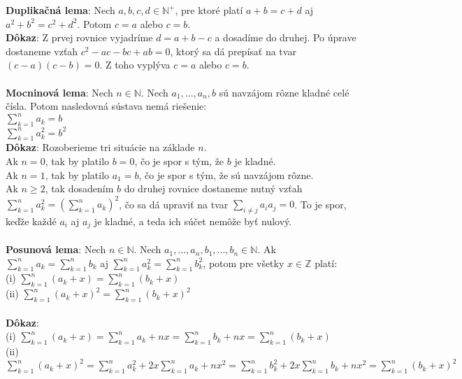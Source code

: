 \documentclass[12pt]{article}
\begin{document}
\textbf{Duplikačná lema}: Nech $a,b,c,d \in \mathbb{N^+}$, pre ktoré platí $a + b = c + d$ aj $a^2 + b^2 = c^2 + d^2$. Potom $c = a$ alebo $c = b$. \\
 
\textbf{Dôkaz}: Z prvej rovnice vyjadríme $d = a + b - c$ a dosadíme do druhej. Po úprave dostaneme vzťah $c^2 - ac - bc + ab = 0$, ktorý sa dá prepísať na tvar $(c - a)(c - b) = 0$. Z toho vyplýva $c = a$ alebo $c = b$. \\\\

\textbf{Mocninová lema}: Nech $n \in \mathbb{N}$. Nech $a_1, ... , a_n , b$ sú navzájom rôzne kladné celé čísla. Potom nasledovná sústava nemá riešenie: \\
$\sum_{k=1}^{n} a_k = b$ \\
$\sum_{k=1}^{n} a^2_k = b^2$ \\

\textbf{Dôkaz}: Rozoberieme tri situácie na základe $n$. \\

Ak $n = 0$, tak by platilo $b = 0$, čo je spor s tým, že $b$ je kladné. \\

Ak $n = 1$, tak by platilo $a_1 = b$, čo je spor s tým, že sú navzájom rôzne. \\

Ak $n \geq 2$, tak dosadením $b$ do druhej rovnice dostaneme nutný vzťah $\sum_{k=1}^{n} a^2_k = (\sum_{k=1}^{n} a_k)^2$, čo sa dá upraviť na tvar $\sum_{i \neq j} a_i a_j = 0$. To je spor, keďže každé $a_i$ aj $a_j$ je kladné, a teda ich súčet nemôže byť nulový. \\\\

\textbf{Posunová lema}: Nech $n \in \mathbb{N}$. Nech $a_1, ... , a_n, b_1, ... , b_n \in \mathbb{N}$. Ak $\sum_{k=1}^{n} a_k = \sum_{k=1}^{n} b_k$ aj $\sum_{k=1}^{n} a^2_k = \sum_{k=1}^{n} b^2_k$, potom pre všetky $x \in \mathbb{Z}$ platí: \\
(i) $\sum_{k=1}^{n} (a_k + x) = \sum_{k=1}^{n} (b_k + x)$ \\
(ii) $\sum_{k=1}^{n} (a_k + x)^2 = \sum_{k=1}^{n} (b_k + x)^2$ \\\\
 
\textbf{Dôkaz}: \\
(i) $\sum_{k=1}^{n} (a_k + x) = \sum_{k=1}^{n} a_k + nx = \sum_{k=1}^{n} b_k + nx = \sum_{k=1}^{n} (b_k + x)$ \\
(ii) $\sum_{k=1}^{n} (a_k + x)^2 = \sum_{k=1}^{n} a^2_k + 2x \sum_{k=1}^{n} a_k + nx^2 = \sum_{k=1}^{n} b^2_k + 2x \sum_{k=1}^{n} b_k + nx^2 = \sum_{k=1}^{n} (b_k + x)^2$ \\\\
\end{document}
